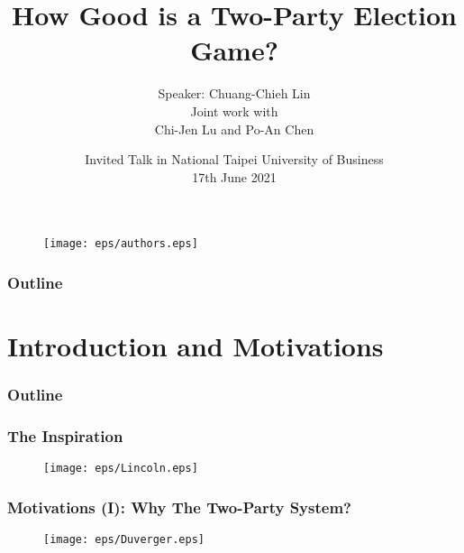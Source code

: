 \documentclass[xcolor=dvipsnames,envcountsect]{beamer}
\title[Two Party Election Game]{How Good is a Two-Party Election Game?}
\author[Lin, Lu, Chen]{
Speaker: Chuang-Chieh Lin\vspace{9pt}\\
Joint work with \vspace{9pt}\\
Chi-Jen Lu and Po-An Chen
}
\institute[TKU, IIS AS, NCYU]{
}
\date[17 Jun 2021]{
{\footnotesize Invited Talk in National Taipei University of Business}\vspace{7pt}\\
{\small 17th June 2021}}
\begin{document}
\maketitle

\begin{frame}
\vspace{12pt}
\begin{figure}
	\begin{center}
		\texttt{[image: eps/authors.eps]}
	\end{center}
\end{figure}	
\end{frame}


\begin{frame}
\frametitle{Outline}
\tableofcontents%
\end{frame}

\section{Introduction and Motivations}


\begin{frame}
\frametitle{Outline}
\end{frame}


\begin{frame}
\frametitle{The Inspiration}
\begin{figure}
	\begin{center}
		\texttt{[image: eps/Lincoln.eps]}
	\end{center}
\end{figure}
\begin{quotation}
\end{quotation}

\end{frame}

\begin{frame}
\frametitle{Motivations (I): Why The Two-Party System?}
\vspace{-6pt}
\begin{figure}
	\begin{center}
		\texttt{[image: eps/Duverger.eps]}
	\end{center}
\end{figure}
\begin{quotation}
\end{quotation}
\end{frame}
\end{document}
